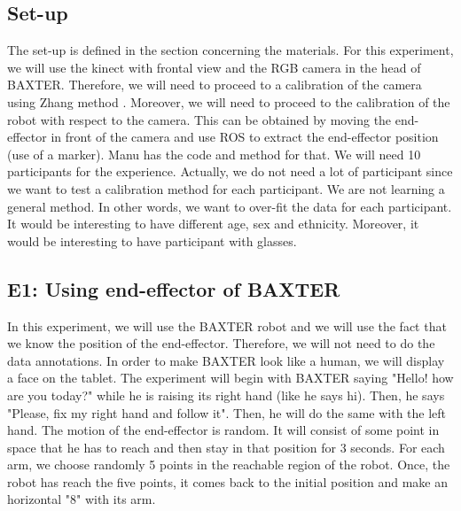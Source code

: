\documentclass[11pt,a4paper]{article}
\begin{document}
\subsection{Set-up}
The set-up is defined in the section concerning the materials. For this experiment, we will use the kinect with frontal view and the RGB camera in the head of BAXTER. Therefore, we will need to proceed to a calibration of the camera using Zhang method \cite{Zhang2000}. Moreover, we will need to proceed to the calibration of the robot with respect to the camera. This can be obtained by moving the end-effector in front of the camera and use ROS to extract the end-effector position (use of a marker). Manu has the code and method for that. We will need 10 participants for the experience. Actually, we do not need a lot of participant since we want to test a calibration method for each participant. We are not learning a general method. In other words, we want to over-fit the data for each participant. It would be interesting to have different age, sex and ethnicity. Moreover, it would be interesting to have participant with glasses.
\subsection{E1: Using end-effector of BAXTER}
In this experiment, we will use the BAXTER robot and we will use the fact that we know the position of the end-effector. Therefore, we will not need to do the data annotations. In order to make BAXTER look like a human, we will display a face on the tablet. The experiment will begin with BAXTER saying "Hello! how are you today?" while he is raising its right hand (like he says hi). Then, he says "Please, fix my right hand and follow it". Then, he will do the same with the left hand. The motion of the end-effector is random. It will consist of some point in space that he has to reach and then stay in that position for 3 seconds. For each arm, we choose randomly 5 points in the reachable region of the robot. Once, the robot has reach the five points, it comes back to the initial position and make an horizontal "8" with its arm.
\end{document}
